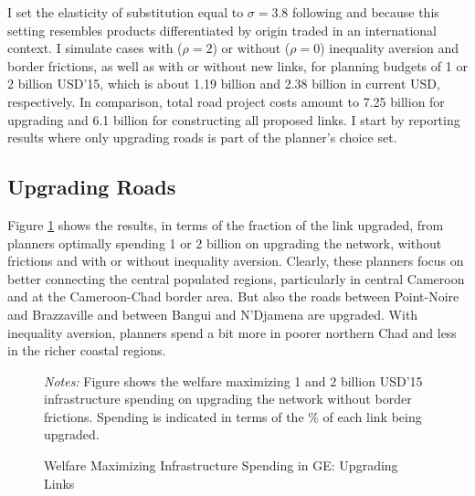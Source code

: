 \documentclass[a4paper]{article}
\begin{document}
I set the elasticity of substitution equal to $\sigma = 3.8$ following \citet{bajzik2020estimating} and \citet{armington1969theory} because this setting resembles products differentiated by origin traded in an international context. I simulate cases with ($\rho = 2$) or without ($\rho = 0$) inequality aversion and border frictions, as well as with or without new links, for planning budgets of 1 or 2 billion USD'15, which is about 1.19 billion and 2.38 billion in current USD, respectively. In comparison, total road project costs amount to 7.25 billion for upgrading and 6.1 billion for constructing all proposed links. I start by reporting results where only upgrading roads is part of the planner's choice set. 

\subsection{Upgrading Roads} 

Figure \ref{fig:GE_UGNOfr} shows the results, in terms of the fraction of the link upgraded, from planners optimally spending 1 or 2 billion on upgrading the network, without frictions and with or without inequality aversion. Clearly, these planners focus on better connecting the central populated regions, particularly in central Cameroon and at the Cameroon-Chad border area. But also the roads between Point-Noire and Brazzaville and between Bangui and N'Djamena are upgraded. With inequality aversion, planners spend a bit more in poorer northern Chad and less in the richer coastal regions. \newline 


\begin{figure}[h!] \vspace{-2mm}
\centering
\caption{\label{fig:GE_UGNOfr} Welfare Maximizing Infrastructure Spending in GE: Upgrading Links}
\vspace{2mm}
\scriptsize 
\emph{Notes:} Figure shows the welfare maximizing 1 and 2 billion USD'15 infrastructure spending on upgrading the network without border frictions. Spending is indicated in terms of the \% of each link being upgraded.  
\end{figure}
\end{document}
